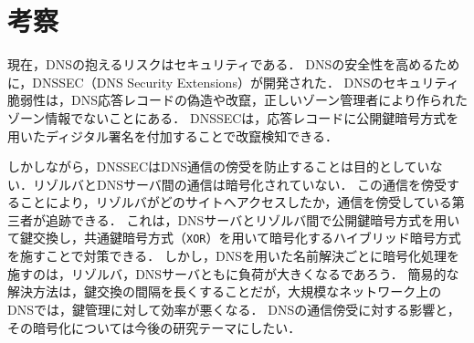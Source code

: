 \section{考察}
現在，DNSの抱えるリスクはセキュリティである．
DNSの安全性を高めるために，DNSSEC（DNS Security Extensions）が開発された．
DNSのセキュリティ脆弱性は，DNS応答レコードの偽造や改竄，正しいゾーン管理者により作られたゾーン情報でないことにある．
DNSSECは，応答レコードに公開鍵暗号方式を用いたディジタル署名を付加することで改竄検知できる．\par
しかしながら，DNSSECはDNS通信の傍受を防止することは目的としていない．リゾルバとDNSサーバ間の通信は暗号化されていない\cite{weko_75812_1}．
この通信を傍受することにより，リゾルバがどのサイトへアクセスしたか，通信を傍受している第三者が追跡できる．
これは，DNSサーバとリゾルバ間で公開鍵暗号方式を用いて鍵交換し，共通鍵暗号方式（\texttt{XOR}）を用いて暗号化するハイブリッド暗号方式を施すことで対策できる．
しかし，DNSを用いた名前解決ごとに暗号化処理を施すのは，リゾルバ，DNSサーバともに負荷が大きくなるであろう．
簡易的な解決方法は，鍵交換の間隔を長くすることだが，大規模なネットワーク上のDNSでは，鍵管理に対して効率が悪くなる．
DNSの通信傍受に対する影響と，その暗号化については今後の研究テーマにしたい．